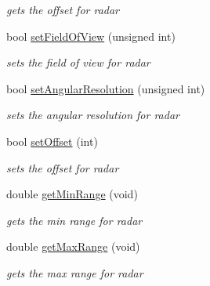 \begin{DoxyCompactItemize}
\begin{DoxyCompactList}\small\item\em gets the offset for radar \end{DoxyCompactList}\item 
bool \hyperlink{classRadar_a1a178ebacc58825322a127b9c4565202}{set\+Field\+Of\+View} (unsigned int)\hypertarget{classRadar_a1a178ebacc58825322a127b9c4565202}{}\label{classRadar_a1a178ebacc58825322a127b9c4565202}

\begin{DoxyCompactList}\small\item\em sets the field of view for radar \end{DoxyCompactList}\item 
bool \hyperlink{classRadar_ad2033a6eed26d66446a52222cc6c7440}{set\+Angular\+Resolution} (unsigned int)\hypertarget{classRadar_ad2033a6eed26d66446a52222cc6c7440}{}\label{classRadar_ad2033a6eed26d66446a52222cc6c7440}

\begin{DoxyCompactList}\small\item\em sets the angular resolution for radar \end{DoxyCompactList}\item 
bool \hyperlink{classRadar_adb2141cd70f71326034fd5f555222f7a}{set\+Offset} (int)\hypertarget{classRadar_adb2141cd70f71326034fd5f555222f7a}{}\label{classRadar_adb2141cd70f71326034fd5f555222f7a}

\begin{DoxyCompactList}\small\item\em sets the offset for radar \end{DoxyCompactList}\item 
double \hyperlink{classRadar_a27e531152e4e4602226b1a6831b19d50}{get\+Min\+Range} (void)\hypertarget{classRadar_a27e531152e4e4602226b1a6831b19d50}{}\label{classRadar_a27e531152e4e4602226b1a6831b19d50}

\begin{DoxyCompactList}\small\item\em gets the min range for radar \end{DoxyCompactList}\item 
double \hyperlink{classRadar_a08fb7eae931cf82b24135230bbded208}{get\+Max\+Range} (void)\hypertarget{classRadar_a08fb7eae931cf82b24135230bbded208}{}\label{classRadar_a08fb7eae931cf82b24135230bbded208}

\begin{DoxyCompactList}\small\item\em gets the max range for radar \end{DoxyCompactList}\end{DoxyCompactItemize}



